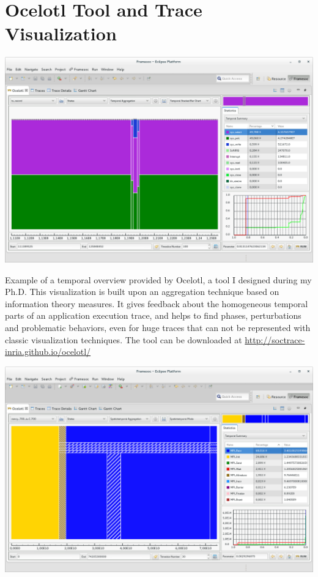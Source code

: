\section{Ocelotl Tool and Trace Visualization}
\vfill
\centering
\begin{minipage}[c]{0.70\textwidth}
  \includegraphics[width=\textwidth]{img/ocelotlt}
\end{minipage}
\vfill
\begin{minipage}[c]{0.80\textwidth}
  Example of a temporal overview provided by Ocelotl, a tool I 
designed during my Ph.D. This visualization is built upon an aggregation 
technique based on information theory measures. It gives feedback about the 
homogeneous temporal parts of an application execution trace, and helps to find 
phases, perturbations and problematic behaviors, even for huge traces that can 
not be represented with classic visualization techniques. The tool can be 
downloaded at
\href{http://soctrace-inria.github.io/ocelotl/}{
http://soctrace-inria.github.io/ocelotl/}
\end{minipage}
\vfill
\begin{minipage}[c]{0.70\textwidth}
 \includegraphics[width=\textwidth]{img/ocelotlst}
\end{minipage}
